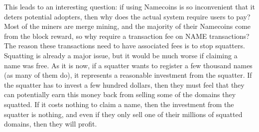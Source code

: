 This leads to an interesting question: if using Namecoins is so inconvenient that it deters potential adopters, then why does the actual system require users to pay? Most of the miners are merge mining, and the majority of their Namecoins come from the block reward, so why require a transaction fee on NAME transactions? The reason these transactions need to have associated fees is to stop squatters. Squatting is already a major issue, but it would be much worse if claiming a name was free. As it is now, if a squatter wants to register a few thousand names (as many of them do),  it represents a reasonable investment from the squatter. If the squatter has to invest a few hundred dollars, then they must feel that they can potentially earn this money back from selling some of the domains they squatted. If it costs nothing to claim a name, then the investment from the squatter is nothing, and even if they only sell one of their millions of squatted domains, then they will profit. 

